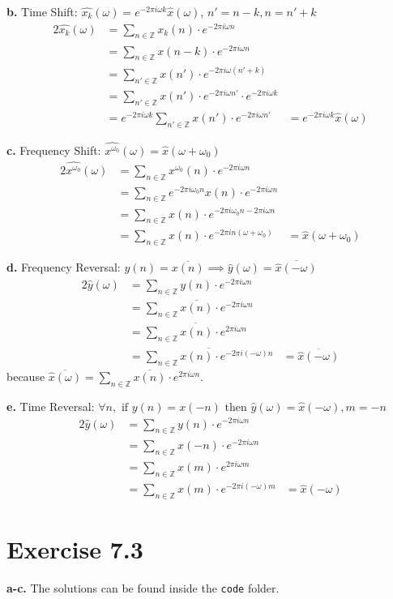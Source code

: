 \documentclass[12pt]{article}
\newcommand{\inte}{\mathbb{Z}}
\newcommand{\eek}{\ensuremath{e^{-2\pi i \omega k}}}
\newcommand{\een}{\ensuremath{e^{-2\pi i \omega n}}}
\begin{document}
	\textbf{b.} Time Shift: $\hat{x_k}(\omega) = \eek \hat{x}(\omega)$, $n' = n-k, n= n'+k$
	\begin{alignat*}{2}
		\hat{x_k}(\omega) &= \sum_{n \in \inte} x_k(n) \cdot \een\\
		&= \sum_{n \in \inte} x(n-k) \cdot \een\\
		&= \sum_{n' \in \inte} x(n') \cdot e^{-2\pi i \omega (n'+k)}\\
		&= \sum_{n' \in \inte} x(n') \cdot e^{-2\pi i \omega n'} \cdot e^{-2\pi i \omega k}\\
		&= e^{-2\pi i \omega k} \sum_{n' \in \inte} x(n') \cdot e^{-2\pi i \omega n'} 
		&= \eek \hat{x}(\omega)
	\end{alignat*}


	\textbf{c.} Frequency Shift: $\widehat{x^{\omega_0}}(\omega) = \hat{x}(\omega + \omega_0)$
	\begin{alignat*}{2}
		\widehat{x^{\omega_0}}(\omega) &= \sum_{n \in \inte} x^{\omega_0}(n) \cdot \een\\
		&= \sum_{n \in \inte} e^{-2\pi i \omega_0 n}x(n) \cdot \een\\
		&= \sum_{n \in \inte} x(n) \cdot e^{-2\pi i \omega_0 n - 2\pi i \omega n}\\
		&= \sum_{n \in \inte} x(n) \cdot e^{-2\pi i n (\omega + \omega_0)}
		&= \hat{x}(\omega + \omega_0)
	\end{alignat*}
	
	
	\textbf{d.} Frequency Reversal: $y(n) = \overline{x(n)} \implies \hat{y}(\omega) = \overline{\hat{x}(-\omega)}$
	\begin{alignat*}{2}
		\hat{y}(\omega) &= \sum_{n \in \inte} y(n) \cdot \een\\
		&= \sum_{n \in \inte} \overline{x(n)} \cdot \een\\
		&= \overline{\sum_{n \in \inte} x(n) \cdot e^{2\pi i \omega n}}\\
		&= \overline{\sum_{n \in \inte} x(n) \cdot e^{-2\pi i (-\omega) n}}
		&= \overline{\hat{x}(-\omega)}
	\end{alignat*}
	because $\overline{\hat{x}(\omega)} = \sum_{n \in \inte} \overline{x(n)} \cdot e^{2\pi i \omega n}$.
	
	
	\textbf{e.} Time Reversal: $ \forall n, \text{ if } y(n) = x(-n) \text{ then } \hat{y}(\omega) = \hat{x}(-\omega), m = -n$
	\begin{alignat*}{2}
		\hat{y}(\omega) &= \sum_{n \in \inte} y(n) \cdot \een\\
		&= \sum_{n \in \inte} x(-n) \cdot \een\\
		&= \sum_{n \in \inte} x(m) \cdot e^{2\pi i \omega m}\\
		&= \sum_{n \in \inte} x(m) \cdot e^{-2\pi i (-\omega) m}
		&= \hat{x}(-\omega)
	\end{alignat*}
	\section*{Exercise 7.3}
	\textbf{a-c.} The solutions can be found inside the \texttt{code} folder.
\end{document}
